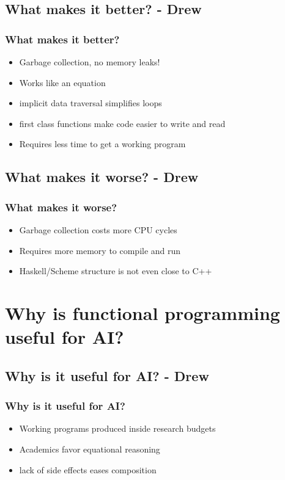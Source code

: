 \documentclass[xcolor=pdftex,dvipsnames,table]{beamer}
\begin{document}
\subsection{What makes it better? - Drew}
\begin{frame}
  \frametitle{What makes it better?}
  \begin{itemize}
  \item Garbage collection, no memory leaks!
  \item Works like an equation
  \item implicit data traversal simplifies loops
  \item first class functions make code easier to write and read
  \item Requires less time to get a working program
  \end{itemize}
\end{frame}

\subsection{What makes it worse? - Drew}
\begin{frame}
  \frametitle{What makes it worse?}
  \begin{itemize}
  \item Garbage collection costs more CPU cycles
  \item Requires more memory to compile and run
  \item Haskell/Scheme structure is not even close to C++
  \end{itemize}
\end{frame}

\section{Why is functional programming useful for AI?}
\subsection{Why is it useful for AI? - Drew}
\begin{frame}
  \frametitle{Why is it useful for AI?}
  \begin{itemize}
  \item Working programs produced inside research budgets
  \item Academics favor equational reasoning
  \item lack of side effects eases composition
  \end{itemize}
\end{frame}
\end{document}
